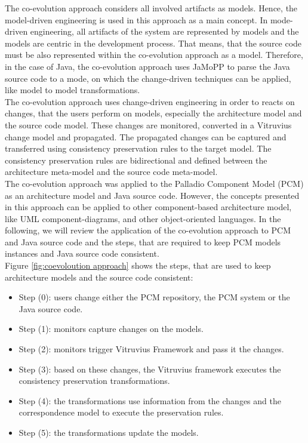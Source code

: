 The co-evolution approach considers all involved artifacts as models. Hence, the model-driven engineering is used in this approach as a main concept. In mode-driven engineering, all artifacts of the system are represented by models and the models are centric in the development process. That means, that the source code must be also represented within the co-evolution approach as a model. Therefore, in the case of Java, the co-evolution approach uses JaMoPP to parse the Java source code to a mode, on which the change-driven techniques can be applied, like model to model transformations.\\

The co-evolution approach uses change-driven engineering in order to reacts on changes, that the users perform on models, especially the architecture model and the source code model. These changes are monitored, converted in a Vitruvius change model and propagated. The propagated changes can be captured and transferred using consistency preservation rules to the target model. The consistency preservation rules are bidirectional and defined between the architecture meta-model and the source code meta-model.\\

The co-evolution approach was applied to the Palladio Component Model (PCM) as an architecture model and Java source code.  However, the concepts presented in this approach can be applied to other component-based architecture model, like UML component-diagrams, and other object-oriented languages. In the following, we will review the application of the co-evolution approach to PCM and Java source code and the steps, that are required to keep PCM models instances and Java source code consistent.\\ 



Figure  \ref{fig:coevoloution approach} shows the steps, that are used to keep architecture models and the source code consistent:

\begin{itemize}
\item Step (0): users change either the PCM repository, the PCM system or the Java source code.  
\item Step (1): monitors capture changes on the models.
\item Step (2):  monitors trigger Vitruvius Framework and pass it the changes.
\item Step (3): based on these changes, the Vitruvius framework executes the consistency preservation transformations. 
\item Step (4): the transformations use information from the changes and the correspondence model to execute the preservation rules.
\item Step (5): the transformations update the models. 
\end{itemize}

